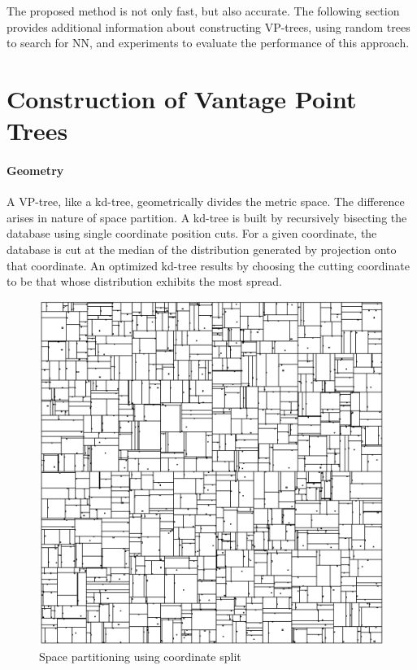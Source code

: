 \documentclass[11pt]{article}
\begin{document}
The proposed method is not only fast, but also accurate. The following section provides additional information about constructing VP-trees, using random trees to search for NN, and experiments to evaluate the performance of this approach. 

\section{Construction of Vantage Point Trees}
\paragraph{Geometry} A VP-tree, like a kd-tree, geometrically divides the metric space. The difference arises in nature of space partition. A kd-tree is built by recursively bisecting the database using single coordinate position cuts. For a given coordinate, the database is cut at the median of the distribution generated by projection onto that coordinate. An optimized kd-tree  results by choosing the cutting coordinate to be that whose distribution exhibits the most spread.~\cite{Yianilos93}
\begin{figure}[h]
\centering
\includegraphics[scale=0.6]{./images/kd-tree.png}
\caption{Space partitioning using coordinate split \cite{Yianilos93}}
\label{fig:kd-tree}
\end{figure}
\end{document}
